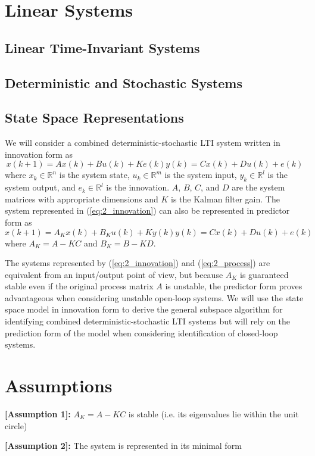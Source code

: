 \section{Linear Systems}

\subsection{Linear Time-Invariant Systems}

\subsection{Deterministic and Stochastic Systems}

\subsection{State Space Representations}
We will consider a combined deterministic-stochastic LTI system written in innovation form as
\begin{subequations}\label{eq:2_innovation}
\begin{equation}x(k+1) = Ax(k) + Bu(k) + Ke(k)\end{equation}
\begin{equation}y(k) = Cx(k) + Du(k) + e(k)\end{equation}
\end{subequations}
where $x_k \in \mathbb{R}^n$ is the system state, $u_k \in \mathbb{R}^m$ is the system input, $y_k \in \mathbb{R}^l$ is the system output, and $e_k \in \mathbb{R}^l$ is the innovation. $A$, $B$, $C$, and $D$ are the system matrices with appropriate dimensions and $K$ is the Kalman filter gain. The system represented in (\ref{eq:2_innovation}) can also be represented in predictor form as
\begin{subequations}\label{eq:2_process}
\begin{equation}x(k+1) = A_Kx(k) + B_Ku(k) + Ky(k)\end{equation}
\begin{equation}y(k) = Cx(k) + Du(k) + e(k)\end{equation}
\end{subequations}
where $A_K = A-KC$ and $B_K = B-KD$.

The systems represented by (\ref{eq:2_innovation}) and (\ref{eq:2_process}) are equivalent from an input/output point of view, but because $A_K$ is guaranteed stable even if the original process matrix $A$ is unstable, the predictor form proves advantageous when considering unstable open-loop systems. We will use the state space model in innovation form to derive the general subspace algorithm for identifying combined deterministic-stochastic LTI systems but will rely on the prediction form of the model when considering identification of closed-loop systems.

\section{Assumptions}

\textbf{[Assumption 1]:} $A_K = A - KC$ is stable (i.e. its eigenvalues lie within the unit circle)

\noindent \textbf{[Assumption 2]:} The system is represented in its minimal form
